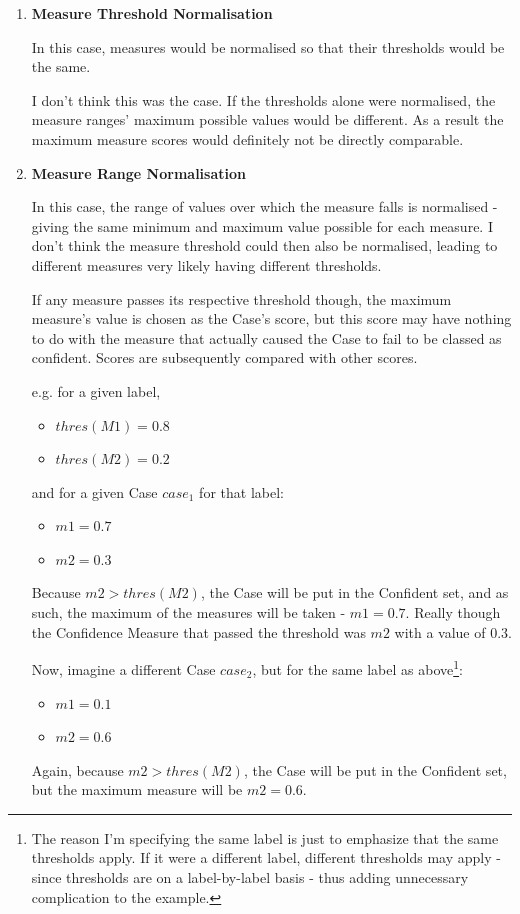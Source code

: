 \documentclass[a4paper,11pt]{report}
\begin{document}
\begin{enumerate}
	\item \textbf{Measure Threshold Normalisation}
	
	In this case, measures would be normalised so that their thresholds would be the same.
	
	I don't think this was the case. If the thresholds alone were normalised, the measure ranges' maximum possible values would be different. As a result the maximum measure scores would definitely not be directly comparable.
	
	\item \textbf{Measure Range Normalisation}
	
	In this case, the range of values over which the measure falls is normalised - giving the same minimum and maximum value possible for each measure. I don't think the measure threshold could then also be normalised, leading to different measures very likely having different thresholds. 
	
	If any measure passes its respective threshold though, the maximum measure's value is chosen as the Case's score, but this score may have nothing to do with the measure that actually caused the Case to fail to be classed as confident. Scores are subsequently compared with other scores.
	
	\begin{samepage}
	e.g. for a given label, 
	\begin{itemize}
		\item $thres(M1) = 0.8$
		\item $thres(M2) = 0.2$
	\end{itemize}
	and for a given Case $case_{1}$ for that label:
	\begin{itemize}
		\item $m1 = 0.7$
		\item $m2 = 0.3$
	\end{itemize}  
	\end{samepage}
	Because $m2 > thres(M2)$, the Case will be put in the Confident set, and as such, the maximum of the measures will be taken - $m1=0.7$. Really though the Confidence Measure that passed the threshold was $m2$ with a value of $0.3$.
	
	Now, imagine a different Case $case_{2}$, but for the same label as above\footnote{The reason I'm specifying the same label is just to emphasize that the same thresholds apply. If it were a different label, different thresholds may apply - since thresholds are on a label-by-label basis - thus adding unnecessary complication to the example.}:
	\begin{itemize}
		\item $m1 = 0.1$
		\item $m2 = 0.6$
	\end{itemize}
	Again, because $m2 > thres(M2)$, the Case will be put in the Confident set, but the maximum measure will be $m2 = 0.6$. 
	

\end{enumerate}
\end{document}
